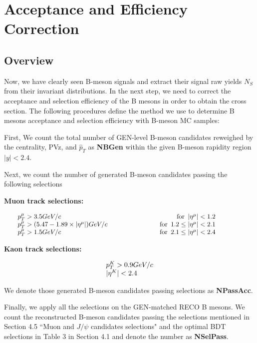 \section{Acceptance and Efficiency Correction} 

\subsection{Overview}

Now, we have clearly seen B-meson signals and extract their signal raw yields $N_S$ from their invariant distributions. In the next step, we need to correct the acceptance and selection efficiency of the B mesons in order to obtain the cross section. The following procedures define the method we use to determine B mesons acceptance and selection efficiency with B-meson MC samples:

First, We count the total number of GEN-level B-meson candidates reweighed by the centrality, PVz, and $\hat p_T$ as \textbf{NBGen} within the given B-meson rapidity region $|y| < 2.4$.

Next, we count the number of generated B-meson candidates passing the following selections

\textbf{Muon track selections:}

\begin{equation}
\centering
\setlength\arraycolsep{20pt}
\begin{array}{l c r r}
p_T^{\mu}>3.5 GeV/c & & \text{for}\enspace |\eta^{\mu}|<1.2 & \\
p_T^{\mu}>(5.47 - 1.89\times |\eta^{\mu}|) GeV/c & &  \text{for}\enspace 1.2\le |\eta^{\mu}|<2.1 &\\
p_T^{\mu}>1.5 GeV/c & & \text{for}\enspace 2.1\le |\eta^{\mu}|<2.4 &
\end{array}
\label{eq:SingleMuonAccCuts}
\end{equation}


\textbf{Kaon track selections:}

\begin{equation}
\centering
\setlength\arraycolsep{20pt}
\begin{array}{l c r r}
p_T^{K}>0.9 GeV/c \\
|\eta^{K}| < 2.4
\end{array}
\label{eq:KaonTrackCut}
\end{equation}

We denote those generated B-meson candidates passing selections as \textbf{NPassAcc}.


Finally, we apply all the selections on the GEN-matched RECO B mesons. We count the reconstructed B-meson candidates passing the selections mentioned in Section 4.5 ``Muon and $J/\psi$ candidates selections" and the optimal BDT selections in Table 3 in Section 4.1 and denote the number as \textbf{NSelPass}.

